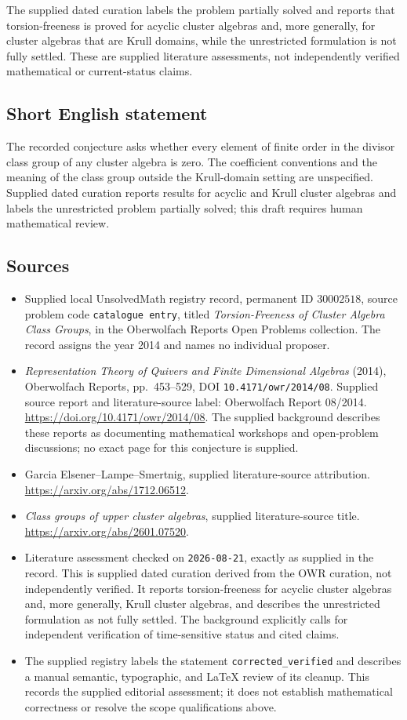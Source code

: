 \documentclass[11pt]{article}
\begin{document}
The supplied dated curation labels the problem partially solved and reports that torsion-freeness is proved for acyclic cluster algebras and, more generally, for cluster algebras that are Krull domains, while the unrestricted formulation is not fully settled. These are supplied literature assessments, not independently verified mathematical or current-status claims.
\subsection{Short English statement}
The recorded conjecture asks whether every element of finite order in the divisor class group of any cluster algebra is zero. The coefficient conventions and the meaning of the class group outside the Krull-domain setting are unspecified. Supplied dated curation reports results for acyclic and Krull cluster algebras and labels the unrestricted problem partially solved; this draft requires human mathematical review.
\subsection{Sources}
\begin{itemize}
\item Supplied local UnsolvedMath registry record, permanent ID \(30002518\), source problem code \texttt{catalogue entry}, titled \emph{Torsion-Freeness of Cluster Algebra Class Groups}, in the Oberwolfach Reports Open Problems collection. The record assigns the year 2014 and names no individual proposer.
\item \emph{Representation Theory of Quivers and Finite Dimensional Algebras} (2014), Oberwolfach Reports, pp.~453--529, DOI \texttt{10.4171/owr/2014/08}. Supplied source report and literature-source label: Oberwolfach Report 08/2014. \url{https://doi.org/10.4171/owr/2014/08}. The supplied background describes these reports as documenting mathematical workshops and open-problem discussions; no exact page for this conjecture is supplied.
\item Garcia Elsener--Lampe--Smertnig, supplied literature-source attribution. \url{https://arxiv.org/abs/1712.06512}.
\item \emph{Class groups of upper cluster algebras}, supplied literature-source title. \url{https://arxiv.org/abs/2601.07520}.
\item Literature assessment checked on \texttt{2026-08-21}, exactly as supplied in the record. This is supplied dated curation derived from the OWR curation, not independently verified. It reports torsion-freeness for acyclic cluster algebras and, more generally, Krull cluster algebras, and describes the unrestricted formulation as not fully settled. The background explicitly calls for independent verification of time-sensitive status and cited claims.
\item The supplied registry labels the statement \texttt{corrected\_verified} and describes a manual semantic, typographic, and LaTeX review of its cleanup. This records the supplied editorial assessment; it does not establish mathematical correctness or resolve the scope qualifications above.
\end{itemize}
\end{document}
